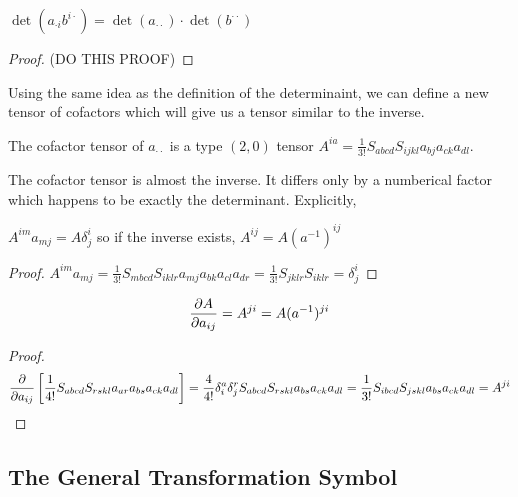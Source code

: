 \documentclass[11pt, a4paper]{article}
\begin{document}
\begin{theorem}
$\det{(a_{\cdot i} b^{i \cdot})} = \det{(a_{\cdot \cdot})} \cdot \det{(b^{\cdot \cdot})}$
\end{theorem}

\begin{proof}
(DO THIS PROOF)
\end{proof}

Using the same idea as the definition of the determinaint, we can define a new tensor of cofactors which will give us a tensor similar to the inverse. 

\begin{definition}
The cofactor tensor of $a_{\cdot \cdot}$ is a type $(2,0)$ tensor $A^{ia} = \frac{1}{3!} S_{abcd} S_{ijkl} a_{bj} a_{ck} a_{dl}$. 
\end{definition}
The cofactor tensor is almost the inverse. It differs only by a numberical factor which happens to be exactly the determinant. Explicitly,
\begin{theorem}
$A^{im} a_{mj} = A \delta^i_j$ so if the inverse exists, $A^{ij} = A (a^{-1})^{ij}$
\end{theorem}

\begin{proof}
$A^{im} a_{mj} = \frac{1}{3!} S_{mbcd} S_{iklr} a_{mj} a_{bk} a_{cl} a_{dr} = \frac{1}{3!} S_{jklr} S_{iklr} = \delta^i_j$
\end{proof}

\begin{theorem}
\[\frac{\partial{A}}{\partial{a_{ij}}} = A^{ji} = A(a^{-1})^{ji}\]
\end{theorem}

\begin{proof}
\[\frac{\partial{}}{\partial{a_{ij}}} \left[ \frac{1}{4!} S_{abcd} S_{rskl} a_{ar} a_{bs} a_{ck} a_{dl} \right] = \frac{4}{4!} \delta^a_i \delta^r_j S_{abcd} S_{rskl} a_{bs} a_{ck} a_{dl} = \frac{1}{3!} S_{ibcd} S_{jskl} a_{bs} a_{ck} a_{dl} = A^{ji} \]
\end{proof}


\subsection{The General Transformation Symbol}
\end{document}

